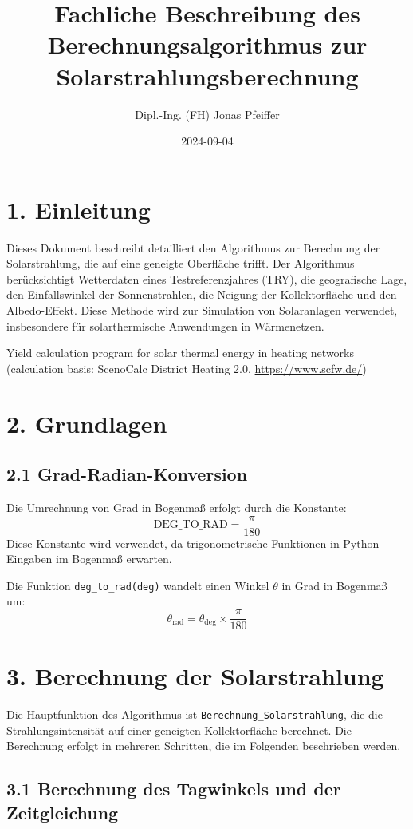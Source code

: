 \documentclass{article}
\title{Fachliche Beschreibung des Berechnungsalgorithmus zur Solarstrahlungsberechnung}
\author{Dipl.-Ing. (FH) Jonas Pfeiffer}
\date{2024-09-04}
\begin{document}
\maketitle

\section*{1. Einleitung}

Dieses Dokument beschreibt detailliert den Algorithmus zur Berechnung der Solarstrahlung, die auf eine geneigte Oberfläche trifft. Der Algorithmus berücksichtigt Wetterdaten eines Testreferenzjahres (TRY), die geografische Lage, den Einfallswinkel der Sonnenstrahlen, die Neigung der Kollektorfläche und den Albedo-Effekt. Diese Methode wird zur Simulation von Solaranlagen verwendet, insbesondere für solarthermische Anwendungen in Wärmenetzen.

Yield calculation program for solar thermal energy in heating networks (calculation basis: ScenoCalc District Heating 2.0, \url{https://www.scfw.de/})

\section*{2. Grundlagen}

\subsection*{2.1 Grad-Radian-Konversion}

Die Umrechnung von Grad in Bogenmaß erfolgt durch die Konstante:
\[
\text{DEG\_TO\_RAD} = \frac{\pi}{180}
\]
Diese Konstante wird verwendet, da trigonometrische Funktionen in Python Eingaben im Bogenmaß erwarten.

Die Funktion \texttt{deg\_to\_rad(deg)} wandelt einen Winkel \( \theta \) in Grad in Bogenmaß um:
\[
\theta_{\text{rad}} = \theta_{\text{deg}} \times \frac{\pi}{180}
\]

\section*{3. Berechnung der Solarstrahlung}

Die Hauptfunktion des Algorithmus ist \texttt{Berechnung\_Solarstrahlung}, die die Strahlungsintensität auf einer geneigten Kollektorfläche berechnet. Die Berechnung erfolgt in mehreren Schritten, die im Folgenden beschrieben werden.

\subsection*{3.1 Berechnung des Tagwinkels und der Zeitgleichung}
\end{document}
